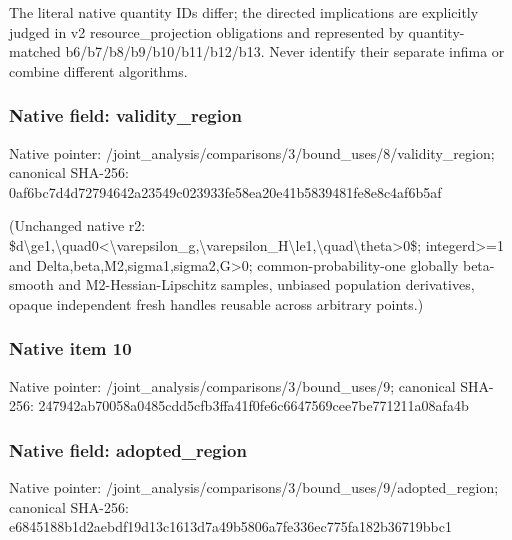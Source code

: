 \documentclass[10pt,a4paper]{article}
\begin{document}
\begingroup\raggedright\sloppy The literal native quantity IDs differ;\allowbreak{} the directed implications are explicitly judged in v2 resource\_\allowbreak{}projection obligations and represented by quantity-matched b6/\allowbreak{}b7/\allowbreak{}b8/\allowbreak{}b9/\allowbreak{}b10/\allowbreak{}b11/\allowbreak{}b12/\allowbreak{}b13. Never identify their separate infima or combine different algorithms.\par\endgroup

\subsubsection{Native field: validity\_\allowbreak{}region}
Native pointer: /joint\_\allowbreak{}analysis/comparisons/3/bound\_\allowbreak{}uses/8/validity\_\allowbreak{}region; canonical SHA-256: 0af6bc7d4d72794642a23549c023933fe58ea20e41b5839481fe8e8c4af6b5af

\begingroup\raggedright\sloppy (Unchanged native r2:\allowbreak{} \$d\textbackslash{}ge1,\allowbreak{}\textbackslash{}quad0<\textbackslash{}varepsilon\_\allowbreak{}g,\allowbreak{}\textbackslash{}varepsilon\_\allowbreak{}H\textbackslash{}le1,\allowbreak{}\textbackslash{}quad\textbackslash{}theta>0\$;\allowbreak{} integerd>=\allowbreak{}1 and Delta,\allowbreak{}beta,\allowbreak{}M2,\allowbreak{}sigma1,\allowbreak{}sigma2,\allowbreak{}G>0;\allowbreak{} common-probability-one globally beta-smooth and M2-Hessian-Lipschitz samples,\allowbreak{} unbiased population derivatives,\allowbreak{} opaque independent fresh handles reusable across arbitrary points.)\par\endgroup

\subsubsection{Native item 10}
Native pointer: /joint\_\allowbreak{}analysis/comparisons/3/bound\_\allowbreak{}uses/9; canonical SHA-256: 247942ab70058a0485cdd5cfb3ffa41f0fe6c6647569cee7be771211a08afa4b

\subsubsection{Native field: adopted\_\allowbreak{}region}
Native pointer: /joint\_\allowbreak{}analysis/comparisons/3/bound\_\allowbreak{}uses/9/adopted\_\allowbreak{}region; canonical SHA-256: e6845188b1d2aebdf19d13c1613d7a49b5806a7fe336ec775fa182b36719bbc1
\end{document}
